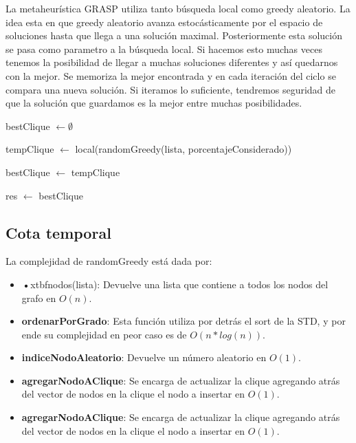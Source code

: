 La metaheurística GRASP utiliza tanto búsqueda local como greedy aleatorio. La idea esta en que greedy aleatorio avanza estocásticamente por el espacio de soluciones hasta que llega a una solución maximal. Posteriormente esta solución se pasa como parametro a la búsqueda local. Si hacemos esto muchas veces tenemos la posibilidad de llegar a muchas soluciones diferentes y así quedarnos con la mejor. Se memoriza la mejor encontrada y en cada iteración del ciclo se compara una nueva solución. Si iteramos lo suficiente, tendremos seguridad de que la solución que guardamos es la mejor entre muchas posibilidades. 

\begin{algorithm}[H]
	\NoCaptionOfAlgo
	\caption{}

	bestClique $\leftarrow \emptyset$
	 
	{
		tempClique $\leftarrow$ local(randomGreedy(lista, porcentajeConsiderado))
		 
		{
			bestClique $\leftarrow$ tempClique
		}
		 
	}
	
	res $\leftarrow$ bestClique

\end{algorithm}

\subsection{Cota temporal}
La complejidad de randomGreedy está dada por:

\begin{itemize}
    \item \textbf{•}xtbf{nodos(lista)}: Devuelve una lista que contiene a todos los nodos del grafo en $O(n)$.

	\item \textbf{ordenarPorGrado}: Esta función utiliza por detrás el sort de la STD, y por ende su complejidad en peor caso es de $O(n*log(n))$.

	\item \textbf{indiceNodoAleatorio}: Devuelve un número aleatorio en $O(1)$.

	\item \textbf{agregarNodoAClique}: Se encarga de actualizar la clique agregando atrás del vector de nodos en la clique el nodo a insertar en $O(1)$.	

	\item \textbf{agregarNodoAClique}: Se encarga de actualizar la clique agregando atrás del vector de nodos en la clique el nodo a insertar en $O(1)$.	

\end{itemize}

